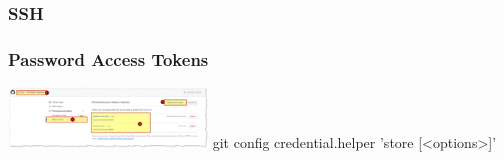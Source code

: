 \documentclass{article}
\begin{document}
\subsubsection{SSH}

\subsubsection{Password Access Tokens}

\includegraphics[width=200px]{images/Personal-Access-Tokens.png}
git config credential.helper 'store [<options>]'
\end{document}
